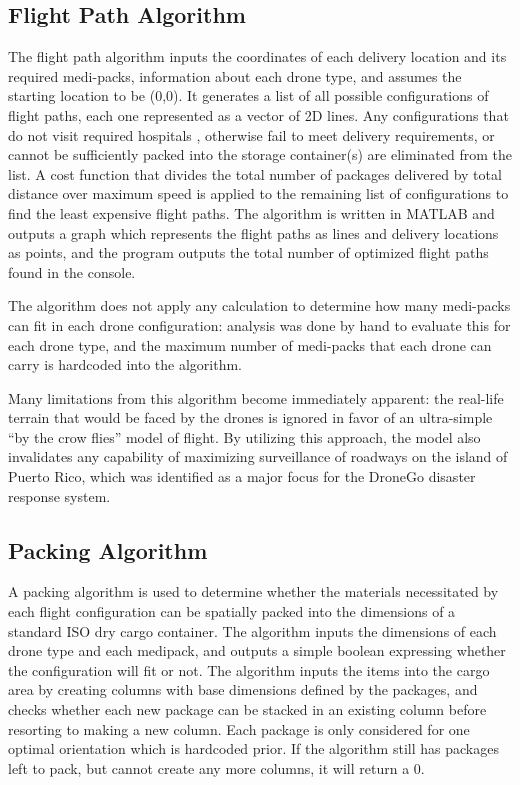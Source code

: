 \documentclass[twocolumn,10pt]{asme2ej}
\begin{document}
 
\subsection{Flight Path Algorithm}
The flight path algorithm inputs the coordinates of each delivery location and its required medi-packs, information about each drone type, and assumes the starting location to be (0,0). It generates a list of all possible configurations of flight paths, each one represented as a vector of 2D lines. Any configurations that do not visit required hospitals , otherwise fail to meet delivery requirements, or cannot be sufficiently packed into the storage container(s) are eliminated from the list. A cost function that divides the total number of packages delivered by total distance over maximum speed is applied to the remaining list of configurations to find the least expensive flight paths. The algorithm is written in MATLAB and outputs a graph which represents the flight paths as lines and delivery locations as points, and the program outputs the total number of optimized flight paths found in the console.

The algorithm does not apply any calculation to determine how many medi-packs can fit in each drone configuration: analysis was done by hand to evaluate this for each drone type, and the maximum number of medi-packs that each drone can carry is hardcoded into the algorithm. 

Many limitations from this algorithm become immediately apparent: the real-life terrain that would be faced by the drones is ignored in favor of an ultra-simple “by the crow flies” model of flight. By utilizing this approach, the model also invalidates any capability of maximizing surveillance of roadways on the island of Puerto Rico, which was identified as a major focus for the DroneGo disaster response system.

\subsection{Packing Algorithm}
A packing algorithm is used to determine whether the materials necessitated by each flight configuration can be spatially packed into the dimensions of a standard ISO dry cargo container. The algorithm inputs the dimensions of each drone type and each medipack, and outputs a simple boolean expressing whether the configuration will fit or not. The algorithm  inputs the items into the cargo area by creating columns with base dimensions defined by the packages, and checks whether each new package can be stacked in an existing column before resorting to making a new column. Each package is only considered for one optimal orientation which is hardcoded prior. If the algorithm still has packages left to pack, but cannot create any more columns, it will return a 0.
\end{document}
